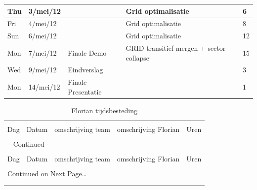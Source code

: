 \documentclass[12pt,a4paper]{report}
\begin{document}
\begin{landscape}
\begin{longtable}{llp{7cm}p{10cm}l}
\hline
Thu & 3/mei/12 &  & Grid optimalisatie & 6 \\ 
\hline
Fri & 4/mei/12 &  & Grid optimalisatie & 8 \\ 
\hline
Sun & 6/mei/12 &  & Grid optimalisatie & 12 \\ 
\hline
Mon & 7/mei/12 & Finale Demo & GRID transitief mergen + sector collapse & 15 \\ 
\hline
Wed & 9/mei/12 & Eindverslag &  & 3\\ 
\hline
Mon & 14/mei/12 & Finale Presentatie &  & 1 \\ 
\hline
\end{longtable}
\normalsize


\begin{longtable}{llp{7cm}p{10cm}l}
\caption{Florian tijdsbesteding} \\

\hline \hline \\[-2ex]
  \multicolumn{1}{l}{Dag} & \multicolumn{1}{l}{Datum} &
  \multicolumn{1}{p{7cm}}{omschrijving team} &
  \multicolumn{1}{p{10cm}}{omschrijving Florian} &
  \multicolumn{1}{l}{Uren}  \\[0.5ex] \hline \\[-1.8ex]
\endfirsthead

\multicolumn{5}{l}{{\tablename} \thetable{} -- Continued} \\[0.5ex]
\hline \hline \\[-2ex]
  \multicolumn{1}{l}{Dag} & \multicolumn{1}{l}{Datum} &
  \multicolumn{1}{p{7cm}}{omschrijving team} &
  \multicolumn{1}{p{10cm}}{omschrijving Florian} &
  \multicolumn{1}{l}{Uren}  \\[0.5ex] \hline \\[-1.8ex]
\endhead

\multicolumn{5}{l}{{Continued on Next Page\ldots}} \\
\endfoot

\\[-1.8ex] \hline \hline
\endlastfoot


\end{longtable}
\end{landscape}
\end{document}
